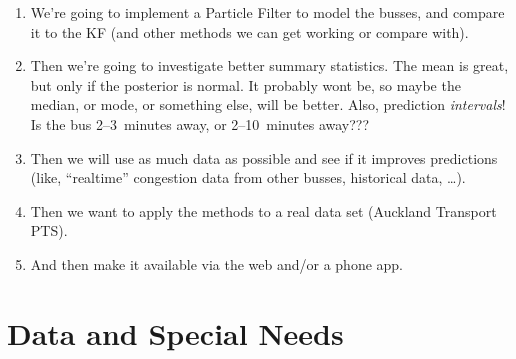 \documentclass[12pt,a4paper]{article}
\begin{document}






\begin{enumerate}
\item 
  We're going to implement a Particle Filter to model the busses,
  and compare it to the KF (and other methods we can get working or compare with).


\item 
  Then we're going to investigate better summary statistics.
  The mean is great, but only if the posterior is normal.
  It probably wont be, so maybe the median, or mode, or something else, will be better.
  Also, prediction \emph{intervals}! Is the bus 2--3~minutes away, or 2--10~minutes away???

\item 
  Then we will use as much data as possible and see if it improves predictions 
  (like, ``realtime'' congestion data from other busses, historical data, \ldots).

\item 
  Then we want to apply the methods to a real data set (Auckland Transport PTS).

\item 
  And then make it available via the web and/or a phone app.

\end{enumerate}







\section{Data and Special Needs}
\label{sec:data}




\end{document}

